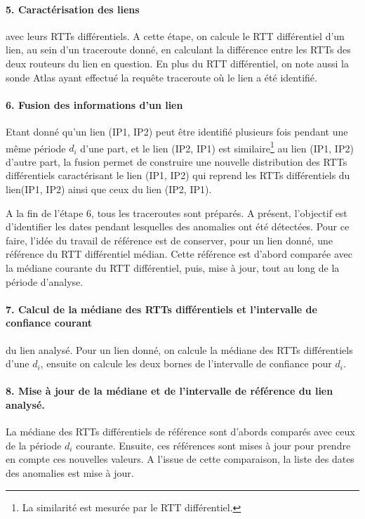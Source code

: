 \paragraph{5. Caractérisation des liens} avec leurs RTTs différentiels. A cette étape, on calcule le RTT différentiel d'un lien, au sein d'un traceroute donné, en calculant la différence entre les RTTs des deux routeurs du lien en question. En plus du RTT différentiel, on note aussi la sonde Atlas ayant effectué la requête traceroute où le lien a été identifié. 

\paragraph{6. Fusion des informations d'un lien} Etant donné qu'un lien (IP1, IP2) peut être identifié plusieurs fois pendant une même période $d_i$ d'une part, et le lien (IP2, IP1) est similaire\footnote{La similarité est mesurée par le RTT différentiel.} au lien  (IP1, IP2) d'autre part, la fusion permet de construire une nouvelle distribution des RTTs différentiels caractérisant le lien (IP1, IP2) qui reprend les RTTs différentiels du lien(IP1, IP2) ainsi que ceux du lien (IP2, IP1).


A la fin de l'étape 6, tous les traceroutes sont préparés. A présent, l'objectif est d'identifier les dates pendant lesquelles des anomalies ont été détectées. Pour ce faire, l'idée du travail de référence est de conserver, pour un lien donné, une référence du RTT différentiel médian.  Cette référence est d'abord comparée avec la médiane courante du RTT différentiel,  puis,  mise à jour,   tout au long de la période d'analyse.

  
  \paragraph{7. Calcul de la médiane des RTTs différentiels et   l'intervalle de confiance courant} du lien analysé. Pour un lien donné, on calcule la médiane des RTTs différentiels d'une $d_i$, ensuite on calcule les deux bornes de l'intervalle de confiance pour $d_i$.
  
 
  
  
  \paragraph{8. Mise à jour de la médiane et de l'intervalle de  référence du lien analysé.} La médiane des RTTs différentiels de référence sont d'abords comparés avec ceux de la période $d_i$ courante. Ensuite, ces références sont mises à jour pour prendre en compte ces nouvelles valeurs. A l'issue de cette comparaison, la liste des dates des anomalies est mise à jour.
  

